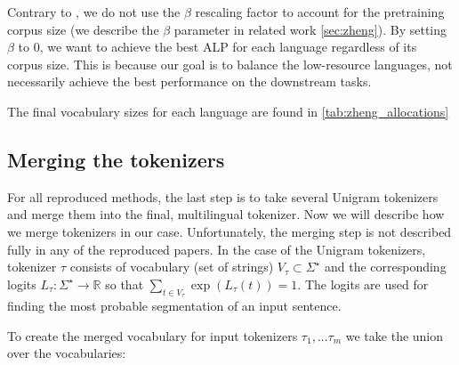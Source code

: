 Contrary to \citet{zheng_allocating_2021}, we do not use the $\beta$ rescaling factor to account for the pretraining corpus size (we describe the $\beta$ parameter in related work \autoref{sec:zheng}). By setting $\beta$ to 0, we want to achieve the best ALP for each language regardless of its corpus size. This is because our goal is to balance the low-resource languages, not necessarily achieve the best performance on the downstream tasks.

The final vocabulary sizes for each language are found in \autoref{tab:zheng_allocations}


\subsection{Merging the tokenizers}
\label{subsec:merging_tokenizers}


For all reproduced methods, the last step is to take several Unigram tokenizers and merge them into the final, multilingual tokenizer. Now we will describe how we merge tokenizers in our case. Unfortunately, the merging step is not described fully in any of the reproduced papers. In the case of the Unigram tokenizers, tokenizer $\tau$ consists of vocabulary (set of strings) $V_\tau \subset \Sigma^\star$ and the corresponding logits $L_\tau: \Sigma^\star \rightarrow \mathbb{R}$ so that $\sum_{t \in V_\tau} \exp(L_\tau(t)) = 1$. The logits are used for finding the most probable segmentation of an input sentence. 

To create the merged vocabulary for input tokenizers $\tau_1, ... \tau_m$ we take the union over the vocabularies:

